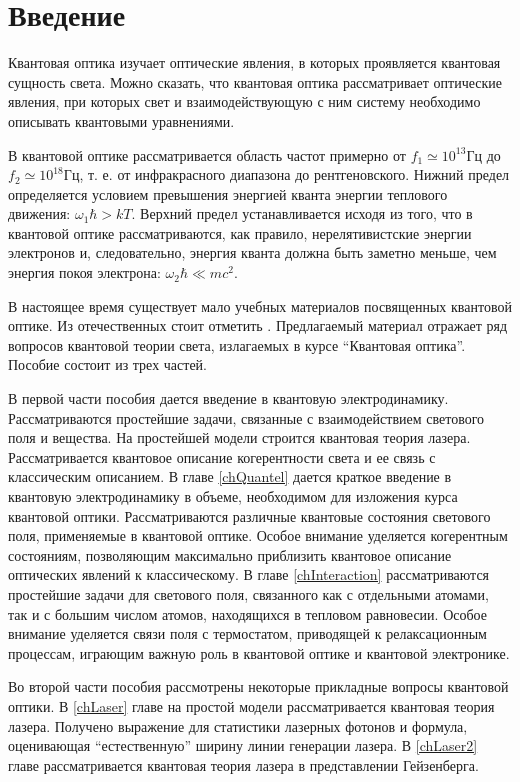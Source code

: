 \chapter*{Введение}

Квантовая оптика изучает оптические явления, в которых проявляется
квантовая сущность света. Можно сказать, что квантовая оптика
рассматривает оптические явления, при которых свет и взаимодействующую
с ним систему необходимо описывать квантовыми уравнениями. 

В квантовой оптике рассматривается область частот примерно от 
\(f_1 \simeq 10^{13} \mbox{Гц}\) до \(f_2 \simeq 10^{18}
\mbox{Гц}\), т. е. от инфракрасного диапазона до
рентгеновского. Нижний предел определяется условием превышения
энергией кванта энергии теплового движения: 
\(\omega_1 \hbar > k T\). Верхний предел
устанавливается исходя из того, что в квантовой оптике
рассматриваются, как правило, нерелятивистские энергии электронов и,
следовательно, энергия кванта должна быть заметно меньше, чем энергия
покоя электрона: \(\omega_2 \hbar \ll m c^2\).

В настоящее время существует мало учебных материалов посвященных
квантовой оптике. Из отечественных стоит отметить 
\cite{bTarasovQuantumOpticsIntro2008}.  Предлагаемый материал отражает
ряд вопросов квантовой теории света, излагаемых в курсе ``Квантовая
оптика''. Пособие состоит из трех частей. 

В первой части пособия дается введение в квантовую
электродинамику. Рассматриваются простейшие задачи, связанные с
взаимодействием светового поля и вещества. На простейшей модели
строится квантовая теория лазера. Рассматривается квантовое описание
когерентности света и ее связь с классическим описанием. 
В главе \ref{chQuantel} дается краткое введение в квантовую
электродинамику в объеме, необходимом для изложения курса квантовой
оптики. Рассматриваются различные квантовые состояния светового поля,
применяемые в квантовой оптике. Особое внимание уделяется когерентным
состояниям, позволяющим максимально приблизить квантовое описание
оптических явлений к классическому. 
В главе \ref{chInteraction} рассматриваются простейшие задачи для
светового поля, 
связанного как с отдельными атомами, так и с большим числом атомов,
находящихся в тепловом равновесии. Особое внимание уделяется
связи поля с термостатом, приводящей к релаксационным процессам,
играющим важную роль в квантовой оптике и квантовой
электронике.

Во второй части пособия рассмотрены некоторые прикладные вопросы
квантовой оптики. В \ref{chLaser} главе на простой модели
рассматривается квантовая теория 
лазера. Получено выражение для статистики лазерных фотонов и формула,
оценивающая ``естественную'' ширину линии генерации лазера. 
В \ref{chLaser2} главе рассматривается квантовая теория лазера в представлении
Гейзенберга.

